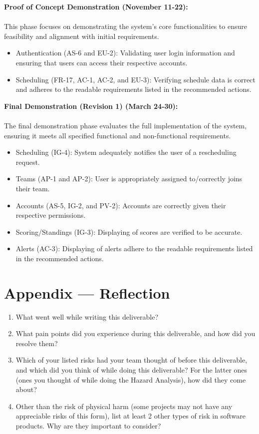\documentclass{article}
\begin{document}
\textbf{Proof of Concept Demonstration (November 11-22):} \\\\
This phase focuses on demonstrating the system's core functionalities to ensure
feasibility and alignment with initial requirements. 
\begin{itemize}
  \item Authentication (AS-6 and EU-2): Validating user login information and ensuring
  that users can access their respective accounts.
  \item Scheduling (FR-17, AC-1, AC-2, and EU-3):  Verifying schedule data is correct
  and adheres to the readable requirements listed in the recommended actions.\\
\end{itemize}

\textbf{Final Demonstration (Revision 1) (March 24-30):} \\\\
The final demonstration phase evaluates the full implementation of the system,
ensuring it meets all specified functional and non-functional requirements.
\begin{itemize}
  \item Scheduling (IG-4): System adequately notifies the user of a rescheduling request.
  \item Teams (AP-1 and AP-2): User is appropriately assigned to/correctly joins their
    team.
  \item Accounts (AS-5, IG-2, and PV-2): Accounts are correctly given their respective 
  permissions.
  \item Scoring/Standings (IG-3): Displaying of scores are verified to be accurate.
  \item Alerts (AC-3): Displaying of alerts adhere to the readable requirements listed
    in the recommended actions.
\end{itemize}

\newpage{}

\section*{Appendix --- Reflection}



\begin{enumerate}
    \item What went well while writing this deliverable? 
    \item What pain points did you experience during this deliverable, and how
    did you resolve them?
    \item Which of your listed risks had your team thought of before this
    deliverable, and which did you think of while doing this deliverable? For
    the latter ones (ones you thought of while doing the Hazard Analysis), how
    did they come about?
    \item Other than the risk of physical harm (some projects may not have any
    appreciable risks of this form), list at least 2 other types of risk in
    software products. Why are they important to consider?
\end{enumerate}
\end{document}
